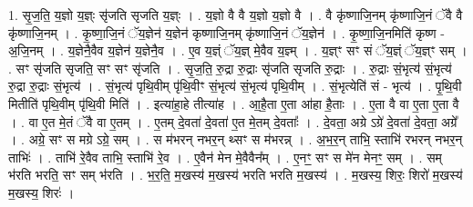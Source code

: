 \documentclass[17pt]{extarticle}
\begin{document}
1. सृ॒ज॒ति॒ य॒ज्ञो य॒ज्ञ्ः सृ॑जति सृजति य॒ज्ञ्ः । . य॒ज्ञो वै वै य॒ज्ञो य॒ज्ञो वै । . वै कृ॑ष्णाजि॒नम् कृ॑ष्णाजि॒नं ॅवै वै कृ॑ष्णाजि॒नम् । . कृ॒ष्णा॒जि॒नं ॅय॒ज्ञेन॑ य॒ज्ञेन॑ कृष्णाजि॒नम् कृ॑ष्णाजि॒नं ॅय॒ज्ञेन॑ । . कृ॒ष्णा॒जि॒नमिति॑ कृष्ण - अ॒जि॒नम् । . य॒ज्ञेनै॒वैव य॒ज्ञेन॑ य॒ज्ञेनै॒व । . ए॒व य॒ज्ञ्ं ॅय॒ज्ञ् मे॒वैव य॒ज्ञ्म् । . य॒ज्ञ्ꣳ सꣳ सं ॅय॒ज्ञ्ं ॅय॒ज्ञ्ꣳ सम् । . सꣳ सृ॑जति सृजति॒ सꣳ सꣳ सृ॑जति । . सृ॒ज॒ति॒ रु॒द्रा रु॒द्राः सृ॑जति सृजति रु॒द्राः । . रु॒द्राः सं॒भृत्य॑ सं॒भृत्य॑ रु॒द्रा रु॒द्राः सं॒भृत्य॑ । . सं॒भृत्य॑ पृथि॒वीम् पृ॑थि॒वीꣳ सं॒भृत्य॑ सं॒भृत्य॑ पृथि॒वीम् । . सं॒भृत्येति॑ सं - भृत्य॑ । . पृ॒थि॒वी मितीति॑ पृथि॒वीम् पृ॑थि॒वी मिति॑ । . इत्या॑हा॒हे तीत्या॑ह । . आ॒है॒ता ए॒ता आ॑हा है॒ताः । . ए॒ता वै वा ए॒ता ए॒ता वै । . वा ए॒त मे॒तं ॅवै वा ए॒तम् । . ए॒तम् दे॒वता॑ दे॒वता॑ ए॒त मे॒तम् दे॒वताः᳚ । . दे॒वता॒ अग्रे ऽग्रे॑ दे॒वता॑ दे॒वता॒ अग्रे᳚ । . अग्रे॒ सꣳ स मग्रे ऽग्रे॒ सम् । . स म॑भरन् नभर॒न् थ्सꣳ स म॑भरन्न् । . अ॒भ॒र॒न् ताभि॒ स्ताभि॑ रभरन् नभर॒न् ताभिः॑ । . ताभि॑ रे॒वैव ताभि॒ स्ताभि॑ रे॒व । . ए॒वैन॑ मेन मे॒वैवैन᳚म् । . ए॒नꣳ॒॒ सꣳ स मे॑न मेनꣳ॒॒ सम् । . सम् भ॑रति भरति॒ सꣳ सम् भ॑रति । . भ॒र॒ति॒ म॒खस्य॑ म॒खस्य॑ भरति भरति म॒खस्य॑ । . म॒खस्य॒ शिरः॒ शिरो॑ म॒खस्य॑ म॒खस्य॒ शिरः॑ । \newline
\end{document}
